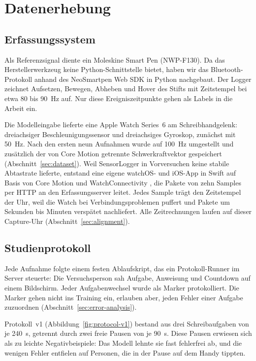 \section{Datenerhebung}
\label{sec:data-collection}

\subsection{Erfassungssystem}

Als Referenzsignal diente ein Moleskine Smart Pen (NWP-F130). Da das
Herstellerwerkzeug keine Python-Schnittstelle bietet, haben wir das
Bluetooth-Protokoll anhand des NeoSmartpen Web SDK \citep{neosmartpen2023}
in Python nachgebaut. Der Logger zeichnet Aufsetzen, Bewegen, Abheben und
Hover des Stifts mit Zeitstempel bei etwa 80 bis 90~Hz auf. Nur diese
Ereigniszeitpunkte gehen als Labels in die Arbeit ein.

Die Modelleingabe lieferte eine Apple Watch Series~6 am Schreibhandgelenk:
dreiachsiger Beschleunigungssensor und dreiachsiges Gyroskop, zunächst mit
50~Hz. Nach den ersten neun Aufnahmen wurde auf 100~Hz umgestellt und
zusätzlich der von Core Motion getrennte Schwerkraftvektor gespeichert
(Abschnitt~\ref{sec:dataset}). Weil SensorLogger \citep{sensorlogger} in
Vorversuchen keine stabile Abtastrate lieferte, entstand eine eigene
watchOS- und iOS-App in Swift auf Basis von Core Motion
\citep{apple_coremotion} und WatchConnectivity
\citep{apple_watchconnectivity}, die Pakete von zehn Samples per HTTP an den
Erfassungsserver leitet. Jedes Sample trägt den Zeitstempel der Uhr, weil die
Watch bei Verbindungsproblemen puffert und Pakete um Sekunden bis Minuten
verspätet nachliefert. Alle Zeitrechnungen laufen auf dieser Capture-Uhr
(Abschnitt~\ref{sec:alignment}).

\subsection{Studienprotokoll}
\label{sec:protocol}

Jede Aufnahme folgte einem festen Ablaufskript, das ein Protokoll-Runner im
Server steuerte: Die Versuchsperson sah Aufgabe, Anweisung und Countdown auf
einem Bildschirm. Jeder Aufgabenwechsel wurde als Marker protokolliert. Die
Marker gehen nicht ins Training ein, erlauben aber, jeden Fehler einer
Aufgabe zuzuordnen (Abschnitt~\ref{sec:error-analysis}).

Protokoll~v1 (Abbildung~\ref{fig:protocol-v1}) bestand aus drei
Schreibaufgaben von je 240~s, getrennt durch zwei freie Pausen von je 90~s.
Diese Pausen erwiesen sich als zu leichte Negativbeispiele: Das Modell lehnte
sie fast fehlerfrei ab, und die wenigen Fehler entfielen auf Personen, die in
der Pause auf dem Handy tippten.

